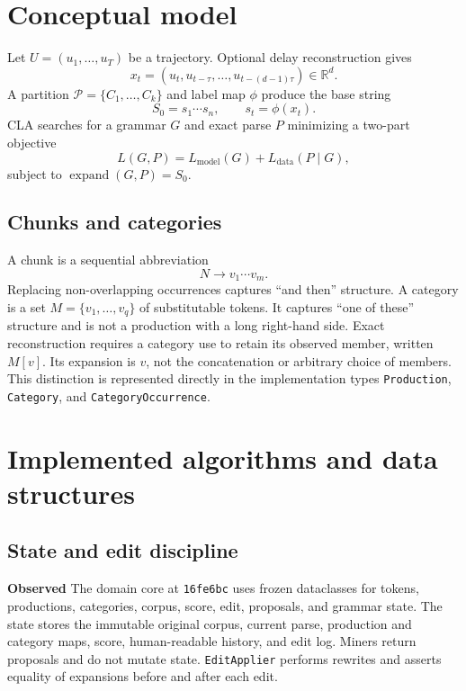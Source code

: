 \documentclass[11pt]{article}
\newcommand{\Observed}{\textbf{Observed}}
\begin{document}
\section{Conceptual model}
Let $U=(u_1,\ldots,u_T)$ be a trajectory. Optional delay reconstruction gives
\begin{equation}
x_t=(u_t,u_{t-\tau},\ldots,u_{t-(d-1)\tau})\in\mathbb{R}^d.
\end{equation}
A partition $\mathcal{P}=\{C_1,\ldots,C_k\}$ and label map $\phi$ produce the base string
\begin{equation}
S_0=s_1\cdots s_n,\qquad s_t=\phi(x_t).
\end{equation}
CLA searches for a grammar $G$ and exact parse $P$ minimizing a two-part objective
\begin{equation}
L(G,P)=L_{\mathrm{model}}(G)+L_{\mathrm{data}}(P\mid G),
\end{equation}
subject to $\operatorname{expand}(G,P)=S_0$.

\subsection{Chunks and categories}
A chunk is a sequential abbreviation
\begin{equation}
N\rightarrow v_1\cdots v_m.
\end{equation}
Replacing non-overlapping occurrences captures ``and then'' structure. A category is a set $M=\{v_1,\ldots,v_q\}$ of substitutable tokens. It captures ``one of these'' structure and is not a production with a long right-hand side. Exact reconstruction requires a category use to retain its observed member, written $M[v]$. Its expansion is $v$, not the concatenation or arbitrary choice of members. This distinction is represented directly in the implementation types \texttt{Production}, \texttt{Category}, and \texttt{CategoryOccurrence}.

\section{Implemented algorithms and data structures}
\subsection{State and edit discipline}
\Observed{} The domain core at \texttt{16fe6bc} uses frozen dataclasses for tokens, productions, categories, corpus, score, edit, proposals, and grammar state. The state stores the immutable original corpus, current parse, production and category maps, score, human-readable history, and edit log. Miners return proposals and do not mutate state. \texttt{EditApplier} performs rewrites and asserts equality of expansions before and after each edit.
\end{document}

